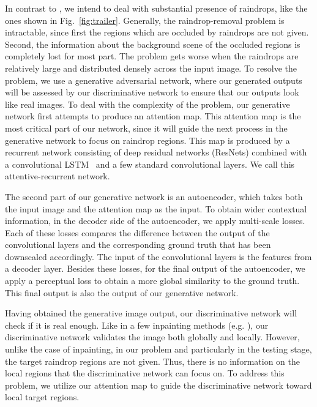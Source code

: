 \documentclass[10pt,twocolumn,letterpaper]{article}
\begin{document}
In contrast to \cite{eigen2013restoring}, we intend to deal with substantial presence of raindrops, like the ones shown in Fig.~\ref{fig:trailer}.  Generally, the raindrop-removal problem is intractable, since first the regions which are occluded by raindrops are not given. Second, the information about the background scene of the occluded regions is completely lost for most part. The problem gets worse when the raindrops are relatively large and distributed densely across the input image.
To resolve the problem, we use a generative adversarial network, where our generated outputs will be assessed by our discriminative network to ensure that our outputs look like real images. To deal with the complexity of the problem, our generative network first attempts to produce an attention map. This attention map is the most critical part of our network, since it will  guide the next process in the generative network to focus on raindrop regions.
This map is produced by a recurrent network consisting of deep residual networks (ResNets) \cite{he2016deep} combined with a convolutional LSTM~\cite{xingjian2015convolutional} and a few standard convolutional layers. We call this attentive-recurrent network. 

The second part of our generative network is an autoencoder, which takes both the input image and the  attention map as the input. To obtain wider contextual information, in the decoder side of the autoencoder, we apply multi-scale losses.  Each of these losses compares the difference between the output of the convolutional layers and the corresponding ground truth that has been downscaled accordingly. The input of the convolutional layers is the features from a decoder layer. Besides these losses, for the final output of the autoencoder, we apply a perceptual loss to obtain a more global similarity to the ground truth. This final output is also the output of our generative network.

Having obtained the generative image output, our discriminative network will check if it is real enough.  Like  in a few inpainting methods (e.g. \cite{iizuka2017globally,li2017generative}), our discriminative network validates the image both globally and locally. However, unlike the case of inpainting, in our problem and particularly in the testing stage, the target raindrop regions are not given. Thus, there is no information on the local regions that the discriminative network can focus on. To address this problem, we utilize our attention map to guide the discriminative network toward local target regions. 
\end{document}
